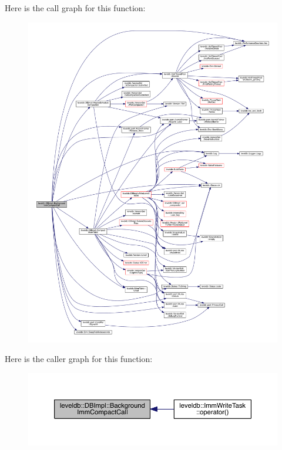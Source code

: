 Here is the call graph for this function\+:\nopagebreak
\begin{figure}[H]
\begin{center}
\leavevmode
\includegraphics[width=350pt]{classleveldb_1_1_d_b_impl_ade59d90db532404c3d0e1b2be91dd407_cgraph}
\end{center}
\end{figure}




Here is the caller graph for this function\+:\nopagebreak
\begin{figure}[H]
\begin{center}
\leavevmode
\includegraphics[width=350pt]{classleveldb_1_1_d_b_impl_ade59d90db532404c3d0e1b2be91dd407_icgraph}
\end{center}
\end{figure}


